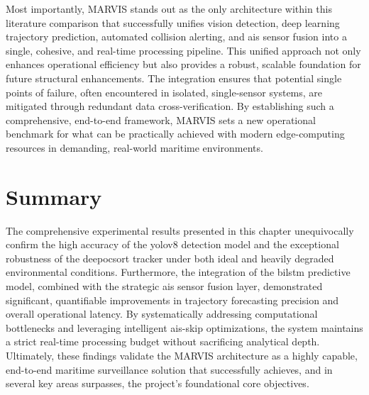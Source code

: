 Most importantly, MARVIS stands out as the only architecture within this literature comparison that successfully unifies vision detection, deep learning trajectory prediction, automated collision alerting, and \gls{ais} sensor fusion into a single, cohesive, and real-time processing pipeline. This unified approach not only enhances operational efficiency but also provides a robust, scalable foundation for future structural enhancements. The integration ensures that potential single points of failure, often encountered in isolated, single-sensor systems, are mitigated through redundant data cross-verification. By establishing such a comprehensive, end-to-end framework, MARVIS sets a new operational benchmark for what can be practically achieved with modern edge-computing resources in demanding, real-world maritime environments.

\section{Summary}
The comprehensive experimental results presented in this chapter unequivocally confirm the high accuracy of the \gls{yolov8} detection model and the exceptional robustness of the \gls{deepocsort} tracker under both ideal and heavily degraded environmental conditions. Furthermore, the integration of the \gls{bilstm} predictive model, combined with the strategic \gls{ais} sensor fusion layer, demonstrated significant, quantifiable improvements in trajectory forecasting precision and overall operational latency. By systematically addressing computational bottlenecks and leveraging intelligent \gls{ais}-skip optimizations, the system maintains a strict real-time processing budget without sacrificing analytical depth. Ultimately, these findings validate the MARVIS architecture as a highly capable, end-to-end maritime surveillance solution that successfully achieves, and in several key areas surpasses, the project's foundational core objectives.
